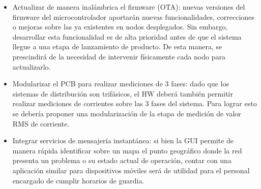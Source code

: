 \begin{itemize}
	\item Actualizar de manera inalámbrica el firmware (OTA): nuevas versiones del firmware del microcontrolador aportarán nuevas funcionalidades, correcciones o mejoras sobre las ya existentes en nodos desplegados. Sin embargo, desarrollar esta funcionalidad es de alta prioridad antes de que el sistema llegue a una etapa de lanzamiento de producto. De esta manera, se prescindirá de la necesidad de intervenir físicamente cada nodo para actualizarlo.\\
	\item Modularizar el PCB para realizar mediciones de 3 fases: dado que los sistemas de distribución son trifásicos, el HW deberá también permitir realizar mediciones de corrientes sobre las 3 fases del sistema. Para lograr esto se debería proponer una modularización de la etapa de medición de valor RMS de corriente.\\
	\item Integrar servicios de mensajería instantánea: si bien la GUI permite de manera rápida identificar sobre un mapa el punto geográfico donde la red presenta un problema o su estado actual de operación, contar con una aplicación similar para dispositivos móviles será de utilidad para el personal encargado de cumplir horarios de guardia.\\
	
\end{itemize}
